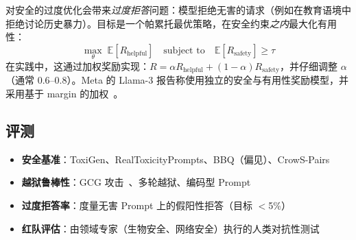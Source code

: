 \begin{intuitionbox}[在有用性与安全性之间平衡]
对安全的过度优化会带来\emph{过度拒答}问题：模型拒绝无害的请求（例如在教育语境中拒绝讨论历史暴力）。目标是一个帕累托最优策略，在安全约束\emph{之内}最大化有用性：
\[
\max_\theta \; \mathbb{E}[R_\text{helpful}] \quad \text{subject to} \quad \mathbb{E}[R_\text{safety}] \geq \tau
\]
在实践中，这通过加权奖励实现：$R = \alpha R_\text{helpful} + (1-\alpha) R_\text{safety}$，并仔细调整 $\alpha$（通常 0.6--0.8）。Meta 的 Llama-3 报告称使用独立的安全与有用性奖励模型，并采用基于 margin 的加权~\cite{grattafiori2024llama3}。
\end{intuitionbox}

\subsection{评测}
\label{evaluation}

\begin{itemize}
  \item \textbf{安全基准}：ToxiGen、RealToxicityPrompts、BBQ（偏见）、CrowS-Pairs
  \item \textbf{越狱鲁棒性}：GCG 攻击~\cite{zou2023universal}、多轮越狱、编码型 Prompt
  \item \textbf{过度拒答率}：度量无害 Prompt 上的假阳性拒答（目标 $<$5\%）
  \item \textbf{红队评估}：由领域专家（生物安全、网络安全）执行的人类对抗性测试
\end{itemize}

